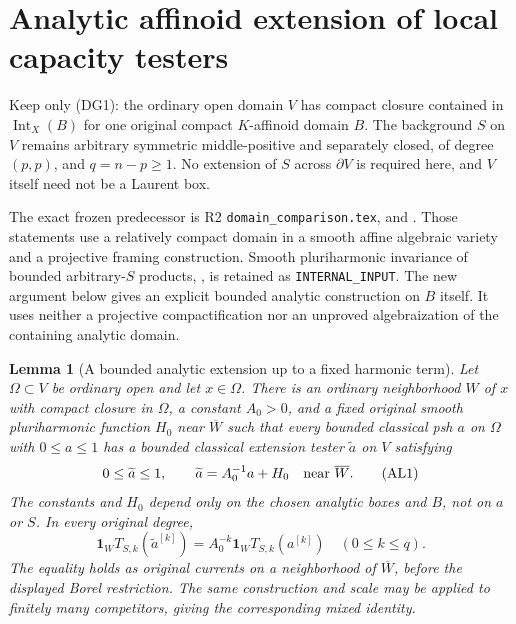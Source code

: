 \documentclass[11pt,a4paper]{article}
\numberwithin{equation}{section}
\newtheorem{lemma}[theorem]{Lemma}
\theoremstyle{definition}
\theoremstyle{remark}
\begin{document}


\section{Analytic affinoid extension of local capacity testers}
\label{sec:r11-analytic-capacity-localization}

Keep only (DG1): the ordinary open domain $V$ has compact
closure contained in $\operatorname{Int}_X(B)$ for one
original compact $K$-affinoid domain $B$. The background $S$
on $V$ remains arbitrary symmetric middle-positive and
separately closed, of degree $(p,p)$, and $q=n-p\geq1$.
No extension of $S$ across $\partial V$ is required here,
and $V$ itself need not be a Laurent box.

The exact frozen predecessor is R2
\texttt{domain\_comparison.tex},
 and
. Those statements
use a relatively compact domain in a smooth affine algebraic
variety and a projective framing construction. Smooth
pluriharmonic invariance of bounded arbitrary-$S$ products,
, is retained as
\texttt{INTERNAL\_INPUT}. The new argument below gives an
explicit bounded analytic construction on $B$ itself.
It uses neither a projective compactification nor an
unproved algebraization of the containing analytic domain.

\begin{lemma}[A bounded analytic extension up to a fixed harmonic term]
\label{lem:r11-affinoid-harmonic-tester-extension}
Let $\Omega\subset V$ be ordinary open and let $x\in\Omega$.
There is an ordinary neighborhood $W$ of $x$ with compact
closure in $\Omega$, a constant $A_0>0$, and a fixed
original smooth pluriharmonic function $H_0$ near $\overline W$
such that every bounded classical psh $a$ on $\Omega$ with
$0\leq a\leq1$ has a bounded classical extension tester
$\widetilde a$ on $V$ satisfying
\[
 0\leq\widetilde a\leq1,\qquad
       \widetilde a=A_0^{-1}a+H_0
                         \quad\hbox{near }\overline W.
 \tag{AL1}
\]
The constants and $H_0$ depend only on the chosen analytic
boxes and $B$, not on $a$ or $S$. In every original degree,
\[
 \mathbf1_W T_{S,k}(\widetilde a^{[k]})
       =A_0^{-k}\mathbf1_W T_{S,k}(a^{[k]})
                         \quad(0\leq k\leq q).
 \tag{AL2}
\]
The equality holds as original currents on a neighborhood
of $\overline W$, before the displayed Borel restriction.
The same construction and scale may be applied to finitely
many competitors, giving the corresponding mixed identity.
\end{lemma}
\end{document}
